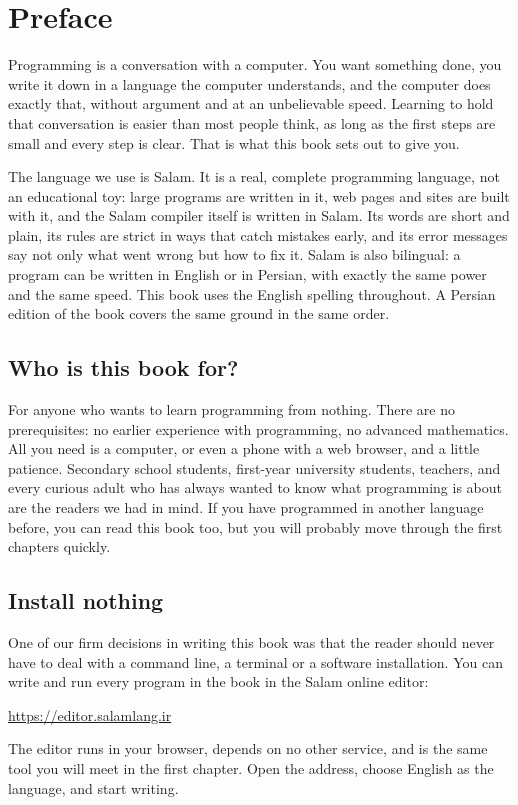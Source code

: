 \chapter*{Preface}

Programming is a conversation with a computer. You want something done, you
write it down in a language the computer understands, and the computer does
exactly that, without argument and at an unbelievable speed. Learning to hold
that conversation is easier than most people think, as long as the first
steps are small and every step is clear. That is what this book sets out to
give you.

The language we use is Salam. It is a real, complete programming language,
not an educational toy: large programs are written in it, web pages and sites
are built with it, and the Salam compiler itself is written in Salam. Its
words are short and plain, its rules are strict in ways that catch mistakes
early, and its error messages say not only what went wrong but how to fix
it. Salam is also bilingual: a program can be written in English or in
Persian, with exactly the same power and the same speed. This book uses the
English spelling throughout. A Persian edition of the book covers the same
ground in the same order.

\section*{Who is this book for?}

For anyone who wants to learn programming from nothing. There are no
prerequisites: no earlier experience with programming, no advanced
mathematics. All you need is a computer, or even a phone with a web browser,
and a little patience. Secondary school students, first-year university
students, teachers, and every curious adult who has always wanted to know
what programming is about are the readers we had in mind. If you have
programmed in another language before, you can read this book too, but you
will probably move through the first chapters quickly.

\section*{Install nothing}

One of our firm decisions in writing this book was that the reader should
never have to deal with a command line, a terminal or a software
installation. You can write and run every program in the book in the Salam
online editor:
\begin{center}
\url{https://editor.salamlang.ir}
\end{center}
The editor runs in your browser, depends on no other service, and is the
same tool you will meet in the first chapter. Open the address, choose
English as the language, and start writing.

